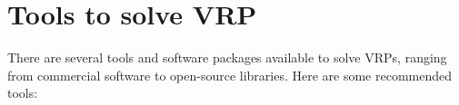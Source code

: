 %
%
%
%
%
%
%
%

\section{Tools to solve VRP}


 There are several tools and software packages available to solve VRPs, ranging from commercial software to open-source libraries. Here are some recommended tools:

